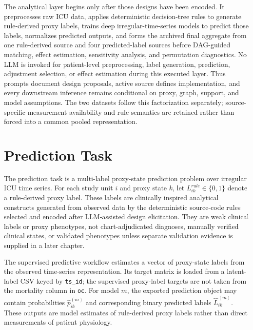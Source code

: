 The analytical layer begins only after those designs have been encoded.  It preprocesses raw ICU data, applies deterministic decision-tree rules to generate rule-derived proxy labels, trains deep irregular-time-series models to predict those labels, normalizes predicted outputs, and forms the archived final aggregate from one rule-derived source and four predicted-label sources before DAG-guided matching, effect estimation, sensitivity analysis, and permutation diagnostics.  No LLM is invoked for patient-level preprocessing, label generation, prediction, adjustment selection, or effect estimation during this executed layer.  Thus prompts document design proposals, active source defines implementation, and every downstream inference remains conditional on proxy, graph, support, and model assumptions.  The two datasets follow this factorization separately; source-specific measurement availability and rule semantics are retained rather than forced into a common pooled representation.

\section{Prediction Task}
\label{sec:problem-definition-study-design:prediction-task}

The prediction task is a multi-label proxy-state prediction problem over irregular ICU time series.  For each study unit \(i\) and proxy state \(k\), let \(L^{rule}_{ik}\in\{0,1\}\) denote a rule-derived proxy label.  These labels are clinically inspired analytical constructs generated from observed data by the deterministic source-code rules selected and encoded after LLM-assisted design elicitation.  They are weak clinical labels or proxy phenotypes, not chart-adjudicated diagnoses, manually verified clinical states, or validated phenotypes unless separate validation evidence is supplied in a later chapter.

The supervised predictive workflow estimates a vector of proxy-state labels from the observed time-series representation.  Its target matrix is loaded from a latent-label CSV keyed by \texttt{ts\_id}; the supervised proxy-label targets are not taken from the mortality column in \texttt{oc}.  For model \(m\), the exported prediction object may contain probabilities \(\hat p^{(m)}_{ik}\) and corresponding binary predicted labels \(\hat L^{(m)}_{ik}\).  These outputs are model estimates of rule-derived proxy labels rather than direct measurements of patient physiology.


